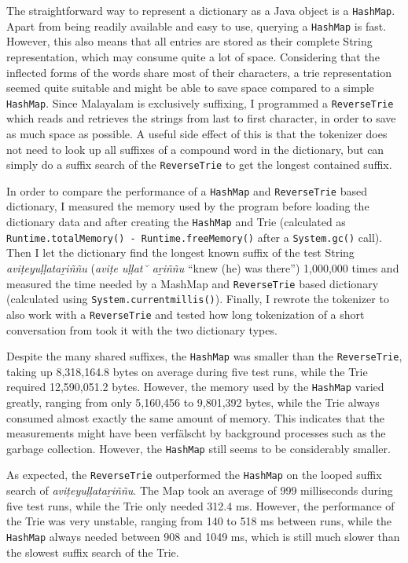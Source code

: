 \documentclass[a4paper]{article}
\newcommand{\typ}[1]{\texttt{#1}}
\begin{document}
The straightforward way to represent a dictionary as a Java object is a \typ{HashMap}. Apart from being readily available and easy to use, querying a \typ{HashMap} is fast. However, this also means that all entries are stored as their complete String representation, which may consume quite a lot of space. Considering that the inflected forms of the words share most of their characters, a trie representation seemed quite suitable and might be able to save space compared to a simple \typ{HashMap}. Since Malayalam is exclusively suffixing, I programmed a \typ{ReverseTrie} which reads and retrieves the strings from last to first character, in order to save as much space as possible. A useful side effect of this is that the tokenizer does not need to look up all suffixes of a compound word in the dictionary, but can simply do a suffix search of the \typ{ReverseTrie} to get the longest contained suffix.

In order to compare the performance of a \typ{HashMap} and \typ{ReverseTrie} based dictionary, I measured the memory used by the program before loading the dictionary data and after creating the \typ{HashMap} and Trie (calculated as \typ{Runtime.totalMemory() - Runtime.freeMemory()} after a \typ{System.gc()} call). Then I let the dictionary find the longest known suffix of the test String \textit{aviṭeyuḷḷataṟiññu} (\textit{aviṭe uḷḷat˘ aṟiññu} ``knew (he) was there'') 1,000,000 times and measured the time needed by a MashMap and \typ{ReverseTrie} based dictionary (calculated using \typ{System.currentmillis()}). Finally, I rewrote the tokenizer to also work with a \typ{ReverseTrie} and tested how long tokenization of a short conversation from \textcite{moag} took it with the two dictionary types.

Despite the many shared suffixes, the \typ{HashMap} was smaller than the \typ{ReverseTrie}, taking up 8,318,164.8 bytes on average during five test runs, while the Trie required 12,590,051.2 bytes. However, the memory used by the \typ{HashMap} varied greatly, ranging from only 5,160,456 to 9,801,392 bytes, while the Trie always consumed almost exactly the same amount of memory. This indicates that the measurements might have been verfälscht by background processes such as the garbage collection. However, the \typ{HashMap} still seems to be considerably smaller.

As expected, the \typ{ReverseTrie} outperformed the \typ{HashMap} on the looped suffix search of \textit{aviṭeyuḷḷataṟiññu}. The Map took an average of 999 milliseconds during five test runs, while the Trie only needed 312.4 ms. However, the performance of the Trie was very unstable, ranging from 140 to 518 ms between runs, while the \typ{HashMap} always needed between 908 and 1049 ms, which is still much slower than the slowest suffix search of the Trie.
\end{document}

